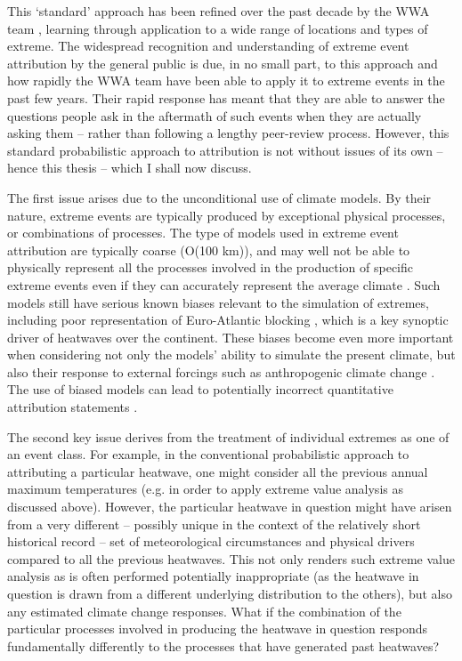     This `standard' approach has been refined over the past decade by the WWA team \citep{van_oldenborgh_pathways_2021}, learning through application to a wide range of locations and types of extreme. The widespread recognition and understanding of extreme event attribution by the general public is due, in no small part, to this approach and how rapidly the WWA team have been able to apply it to extreme events in the past few years. Their rapid response has meant that they are able to answer the questions people ask in the aftermath of such events when they are actually asking them -- rather than following a lengthy peer-review process. However, this standard probabilistic approach to attribution is not without issues of its own -- hence this thesis -- which I shall now discuss.

    The first issue arises due to the unconditional use of climate models. By their nature, extreme events are typically produced by exceptional physical processes, or combinations of processes. The type of models used in extreme event attribution are typically coarse (O(100 km)), and may well not be able to physically represent all the processes involved in the production of specific extreme events even if they can accurately represent the average climate \citep{sillmann_understanding_2017,trenberth_attribution_2015,demory_role_2014}. Such models still have serious known biases relevant to the simulation of extremes, including poor representation of Euro-Atlantic blocking \citep{schiemann_resolution_2017,dorrington_how_2021}, which is a key synoptic driver of heatwaves over the continent. These biases become even more important when considering not only the models' ability to simulate the present climate, but also their response to external forcings such as anthropogenic climate change \citep{palmer_nonlinear_1999,palmer_simple_2018}. The use of biased models can lead to potentially incorrect quantitative attribution statements \citep{bellprat_attribution_2016,bellprat_towards_2019}. 
    
    The second key issue derives from the treatment of individual extremes as one of an event class. For example, in the conventional probabilistic approach to attributing a particular heatwave, one might consider all the previous annual maximum temperatures (e.g. in order to apply extreme value analysis as discussed above). However, the particular heatwave in question might have arisen from a very different -- possibly unique in the context of the relatively short historical record -- set of meteorological circumstances and physical drivers compared to all the previous heatwaves. This not only renders such extreme value analysis as is often performed potentially inappropriate (as the heatwave in question is drawn from a different underlying distribution to the others), but also any estimated climate change responses. What if the combination of the particular processes involved in producing the heatwave in question responds fundamentally differently to the processes that have generated past heatwaves?
    
